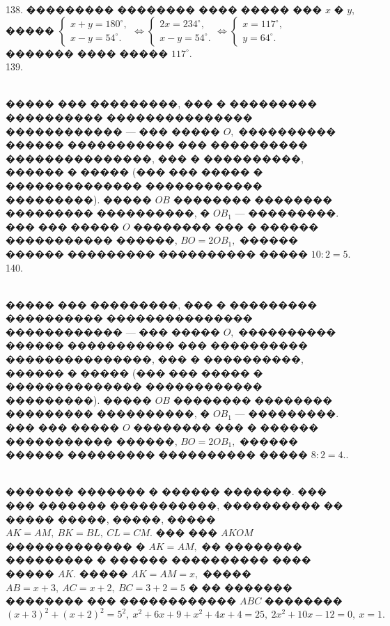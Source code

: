 \documentclass[12pt]{article}
\begin{document}
138. ��������� �������� ���� ����� ��� $x$ � $y,$ ����� $\begin{cases} x+y=180^\circ,\\x-y=54^\circ.\end{cases}\Leftrightarrow
\begin{cases} 2x=234^\circ,\\x-y=54^\circ.\end{cases}\Leftrightarrow\begin{cases} x=117^\circ,\\y=64^\circ.\end{cases}$\\
������� ���� ����� $117^\circ.$\\
139. \begin{figure}[ht!]
\end{figure}\\
����� ��� ���������, ��� � ��������� ���������� ��������������� ������������ --- ��� ����� $O,$ ���������� ������ ����������� ��� ���������� ���������������, ��� � ����������, ������ � ����� (��� ��� ����� � �������������� ������������ ���������). ����� $OB$ �������� �������� ��������� ����������, � $OB_1$ --- ���������. ��� ��� ����� $O$ �������� ��� � ������ ����������� ������, $BO=2OB_1,$ ������ ������ ��������� ���������� ����� $10:2=5.$\\
140. \begin{figure}[ht!]
\end{figure}\\
����� ��� ���������, ��� � ��������� ���������� ��������������� ������������ --- ��� ����� $O,$ ���������� ������ ����������� ��� ���������� ���������������, ��� � ����������, ������ � ����� (��� ��� ����� � �������������� ������������ ���������). ����� $OB$ �������� �������� ��������� ����������, � $OB_1$ --- ���������. ��� ��� ����� $O$ �������� ��� � ������ ����������� ������, $BO=2OB_1,$ ������ ������ ��������� ���������� ����� $8:2=4.$\newpage{}. \begin{figure}[ht!]
\end{figure}\\
������� ������� � ������ �������. ��� ��� ������� �����������, ���������� �� ����� �����, �����, ����� $AK=AM,\ BK=BL,\ CL=CM.$ ��� ��� $AKOM$ ������������� � $AK=AM,$ �� �������� ��������� � ������ ���������� ���� ����� $AK.$ ����� $AK=AM=x,$ ����� $AB=x+3,\ AC=x+2,\ BC=3+2=5$ � �� ������� �������� ��� ������������ $ABC$ �������� $(x+3)^2+(x+2)^2=5^2,\ x^2+6x+9+x^2+4x+4=25,\ 2x^2+10x-12=0,\ x=1.$\\
\end{document}
